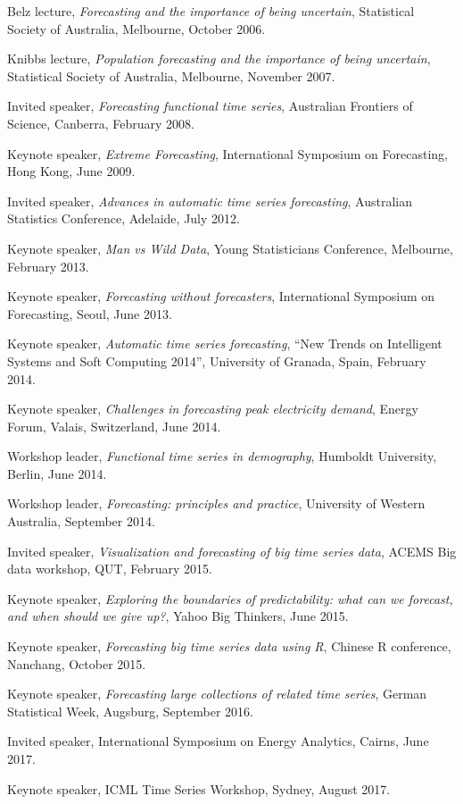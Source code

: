 \documentclass[a4paper,10pt]{article}
\begin{document}
\begin{compactitem}\itemsep=0.1cm
\item Belz lecture, \emph{Forecasting and the importance of being uncertain}, Statistical Society of Australia, Melbourne, October 2006.
\item Knibbs lecture, \emph{Population forecasting and the importance of being uncertain}, Statistical Society of Australia, Melbourne, November 2007.
\item Invited speaker, \emph{Forecasting functional time series}, Australian Frontiers of Science, Canberra, February 2008.
\item Keynote speaker, \emph{Extreme Forecasting}, International Symposium on Forecasting, Hong Kong, June 2009.
\item Invited speaker, \emph{Advances in automatic time series forecasting}, Australian Statistics Conference, Adelaide, July 2012.
\item Keynote speaker, \emph{Man vs Wild Data}, Young Statisticians Conference, Melbourne, February 2013.
\item Keynote speaker, \emph{Forecasting without forecasters}, {International Symposium on Forecasting}, Seoul, June 2013.
\item Keynote speaker, \emph{Automatic time series forecasting},  ``New Trends on Intelligent Systems and Soft Computing 2014'', University of Granada, Spain, February 2014.
\item Keynote speaker, \emph{Challenges in forecasting peak electricity demand}, Energy Forum, Valais, Switzerland, June 2014.
\item Workshop leader, \emph{Functional time series in demography}, Humboldt University, Berlin, June 2014.
\item Workshop leader, \emph{Forecasting: principles and practice}, University of Western Australia, September 2014.
\item Invited speaker, \emph{Visualization and forecasting of big time series data},   ACEMS Big data workshop, QUT, February 2015.
\item Keynote speaker,  \emph{Exploring the boundaries of predictability: what can we forecast, and when should we give up?}, Yahoo Big Thinkers, June 2015.
\item Keynote speaker, \emph{Forecasting big time series data using R}, Chinese R conference, Nanchang, October 2015.
\item Keynote speaker, \emph{Forecasting large collections of related time series}, German Statistical Week, Augsburg, September 2016.
\item Invited speaker, International Symposium on Energy Analytics, Cairns, June 2017.
\item Keynote speaker, ICML Time Series Workshop, Sydney, August 2017.
\end{compactitem}
\end{document}

